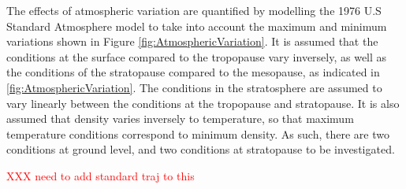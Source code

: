 The effects of atmospheric variation are quantified by modelling the 1976 U.S Standard Atmosphere model to take into account the maximum and minimum variations shown in Figure \ref{fig:AtmosphericVariation}. It is assumed that the conditions at the surface compared to the tropopause vary inversely, as well as the conditions of the stratopause compared to the mesopause, as indicated in \ref{fig:AtmosphericVariation}. The conditions in the stratosphere are assumed to vary linearly between the conditions at the tropopause and stratopause. It is also assumed that density varies inversely to temperature, so that maximum temperature conditions correspond to minimum density. As such, there are two conditions at ground level, and two conditions at stratopause to be investigated. 

\textcolor{red}{XXX need to add standard traj to this}

